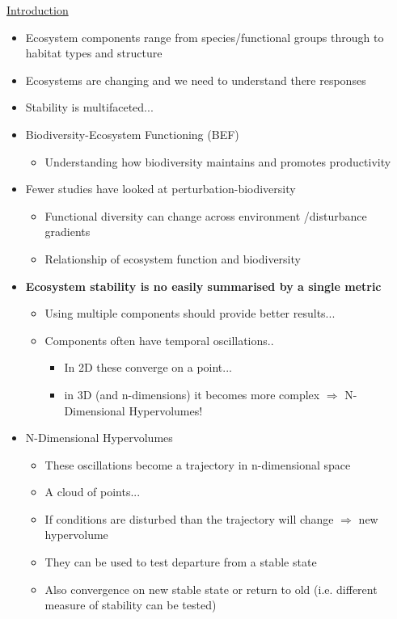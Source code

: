 \underline{Introduction}
\begin{itemize}
	\item Ecosystem components range from species/functional groups through to habitat types and structure
	\item Ecosystems are changing and we need to understand there responses
	\item Stability is multifaceted...
	\item Biodiversity-Ecosystem Functioning (BEF)
	\begin{itemize}
		\item Understanding how biodiversity maintains and promotes productivity
	\end{itemize}
	\item Fewer studies have looked at perturbation-biodiversity
	\begin{itemize}
		\item Functional diversity can change across environment /disturbance gradients
		\item Relationship of ecosystem function and biodiversity
	\end{itemize}
	\item \textbf{Ecosystem stability is no easily summarised by a single metric}
	\begin{itemize}
		\item Using multiple components should provide better results...
		\item Components often have temporal oscillations..
		\begin{itemize}
			\item In 2D these converge on a point...
			\item in 3D (and n-dimensions) it becomes more complex $\Rightarrow$ N-Dimensional Hypervolumes!
		\end{itemize}
	\end{itemize}
	\item N-Dimensional Hypervolumes
\begin{itemize}
	\item These oscillations become a trajectory in n-dimensional space
	\item A cloud of points...
	\item If conditions are disturbed than the trajectory will change $\Rightarrow$ new hypervolume
	\item They can be used to test departure from a stable state
	\item Also convergence on new stable state or return to old (i.e. different measure of stability can be tested)

\end{itemize}
\end{itemize}
